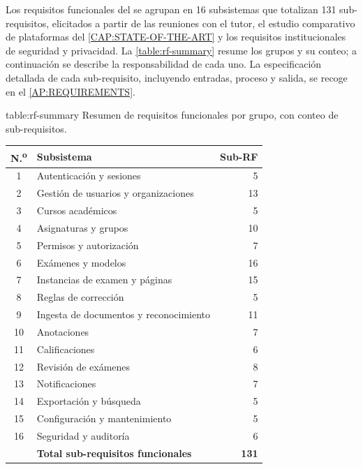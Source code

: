 Los requisitos funcionales del  se agrupan en 16 subsistemas
que totalizan 131 sub-requisitos, elicitados a partir de las reuniones con
el tutor, el estudio comparativo de plataformas del
\cref{CAP:STATE-OF-THE-ART} y los requisitos institucionales de seguridad
y privacidad. La \cref{table:rf-summary} resume los grupos y su conteo;
a continuación se describe la responsabilidad de cada uno. La
especificación detallada de cada sub-requisito, incluyendo entradas,
proceso y salida, se recoge en el \cref{AP:REQUIREMENTS}.

\begin{table}[Resumen de requisitos por grupo]%
            {table:rf-summary}%
            {Resumen de requisitos funcionales por grupo, con conteo de
             sub-requisitos.}
  \small
  \renewcommand{\arraystretch}{1.2}
  \begin{tabular}{c l r}
    \hline
    \textbf{N.\textsuperscript{o}} & \textbf{Subsistema} & \textbf{Sub-RF} \\
    \hline
    1  & Autenticación y sesiones                       & 5   \\
    2  & Gestión de usuarios y organizaciones           & 13  \\
    3  & Cursos académicos                              & 5   \\
    4  & Asignaturas y grupos                           & 10  \\
    5  & Permisos y autorización                        & 7   \\
    6  & Exámenes y modelos                             & 16  \\
    7  & Instancias de examen y páginas                 & 15  \\
    8  & Reglas de corrección                           & 5   \\
    9  & Ingesta de documentos y reconocimiento         & 11  \\
    10 & Anotaciones                                    & 7   \\
    11 & Calificaciones                                 & 6   \\
    12 & Revisión de exámenes                           & 8   \\
    13 & Notificaciones                                 & 7   \\
    14 & Exportación y búsqueda                         & 5   \\
    15 & Configuración y mantenimiento                  & 5   \\
    16 & Seguridad y auditoría                          & 6   \\
    \hline
       & \textbf{Total sub-requisitos funcionales}      & \textbf{131} \\
    \hline
  \end{tabular}
\end{table}

